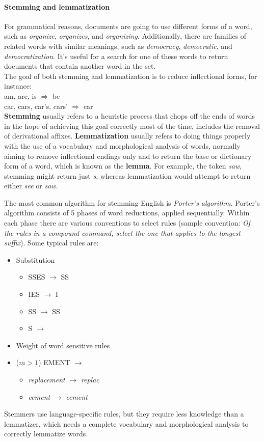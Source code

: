 \documentclass[letterpaper,11pt]{article}
\begin{document}
\paragraph{Stemming and lemmatization}
For grammatical reasons, documents are going to use different forms of a word, such as \textit{organize}, \textit{organizes}, and \textit{organizing}. Additionally, there are families of related words with similar meanings, such as \textit{democracy}, \textit{democratic}, and \textit{democratization}. It's useful for a search for one of these words to return documents that contain another word in the set.\\
The goal of both stemming and lemmatization is to reduce inflectional forms, for instance:
\medskip\\
\indent am, are, is $\Rightarrow$ be\\
\indent car, cars, car’s, cars’ $\Rightarrow$ car
\medskip\\
\textbf{Stemming} usually refers to a heuristic process that chops off the ends of words in the hope of achieving this goal correctly most of the time, includes the removal of derivational affixes. \textbf{Lemmatization} usually refers to doing things properly with the use of a vocabulary and morphological analysis of words, normally aiming to remove inflectional endings only and to return the base or dictionary form of a word, which is known as the \textbf{lemma}. For example, the token \textit{saw}, stemming might return just \textit{s}, whereas lemmatization would attempt to return either \textit{see} or \textit{saw}.

The most common algorithm for stemming English is \textit{Porter’s algorithm}. Porter’s algorithm consists of 5 phases of word reductions, applied sequentially. Within each phase there are various conventions to select rules (sample convention: \textit{Of the rules in a compound command, select the one that applies to the longest suffix}). Some typical rules are:
\begin{itemize}
    \item Substitution
    \begin{itemize}
        \item SSES $\rightarrow$ SS
        \item IES $\rightarrow$ I
        \item SS $\rightarrow$ SS
        \item S $\rightarrow$ 
    \end{itemize}
    \item Weight of word sensitive rules
    \item ($m > 1$) EMENT $\rightarrow$
    \begin{itemize}
        \item \textit{replacement} $\rightarrow$ \textit{replac}
        \item \textit{cement} $\rightarrow$ \textit{cement}
    \end{itemize}
\end{itemize}
Stemmers use language-specific rules, but they require less knowledge than a lemmatizer, which needs a complete vocabulary and morphological analysis to correctly lemmatize words.
\end{document}
